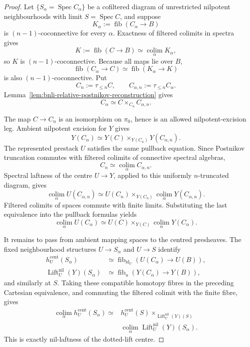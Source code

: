 \begin{proof}
Let $\{S_\alpha=\operatorname{Spec}C_\alpha\}$ be a cofiltered diagram of
unrestricted nilpotent neighbourhoods with limit
$S=\operatorname{Spec}C$, and suppose
\[
    K_\alpha:=\operatorname{fib}(C_\alpha\to B)
\]
is $(n-1)$-coconnective for every $\alpha$.  Exactness of filtered colimits
in spectra gives
\[
    K:=\operatorname{fib}(C\to B)
    \simeq
    \operatorname*{colim}_\alpha K_\alpha,
\]
so $K$ is $(n-1)$-coconnective.  Because all maps lie over $B$,
\[
    \operatorname{fib}(C_\alpha\to C)
    \simeq
    \operatorname{fib}(K_\alpha\to K)
\]
is also $(n-1)$-coconnective.  Put
\[
    C_n:=\tau_{\leq n}C,
    \qquad
    C_{\alpha,n}:=\tau_{\leq n}C_\alpha.
\]
Lemma~\ref{lem:bnli-relative-postnikov-reconstruction} gives
\[
\boxed{
    C_\alpha
    \simeq
    C\times_{C_n}C_{\alpha,n}.}
\]

The map $C\to C_n$ is an isomorphism on $\pi_0$, hence is an allowed
nilpotent-excision leg.  Ambient nilpotent excision for $Y$ gives
\[
\boxed{
    Y(C_\alpha)
    \simeq
    Y(C)\times_{Y(C_n)}Y(C_{\alpha,n}).}
\]
The represented prestack $U$ satisfies the same pullback equation.  Since
Postnikov truncation commutes with filtered colimits of connective spectral
algebras,
\[
    C_n\simeq\operatorname*{colim}_\alpha C_{\alpha,n}.
\]
Spectral laftness of the centre $U\to Y$, applied to this uniformly
$n$-truncated diagram, gives
\[
\boxed{
    \operatorname*{colim}_\alpha U(C_{\alpha,n})
    \simeq
    U(C_n)\times_{Y(C_n)}
    \operatorname*{colim}_\alpha Y(C_{\alpha,n}).}
\]
Filtered colimits of spaces commute with finite limits.  Substituting the last
equivalence into the pullback formulas yields
\[
\boxed{
    \operatorname*{colim}_\alpha U(C_\alpha)
    \simeq
    U(C)\times_{Y(C)}
    \operatorname*{colim}_\alpha Y(C_\alpha).}
\]

It remains to pass from ambient mapping spaces to the centred presheaves.  The
fixed neighbourhood structures $U\to S_\alpha$ and $U\to S$ identify
\[
\begin{aligned}
    h_U^{\mathrm{cent}}(S_\alpha)
    &\simeq
    \operatorname{fib}_{\operatorname{id}_U}
    \left(U(C_\alpha)\to U(B)\right),\\
    \operatorname{Lift}^{\mathrm{nil}}_U(Y)(S_\alpha)
    &\simeq
    \operatorname{fib}_{u}
    \left(Y(C_\alpha)\to Y(B)\right),
\end{aligned}
\]
and similarly at $S$.  Taking these compatible homotopy fibres in the
preceding Cartesian equivalence, and commuting the filtered colimit with the
finite fibre, gives
\[
\boxed{
\begin{aligned}
    \operatorname*{colim}_\alpha h_U^{\mathrm{cent}}(S_\alpha)
    \simeq{}&
    h_U^{\mathrm{cent}}(S)
    \times_{\operatorname{Lift}^{\mathrm{nil}}_U(Y)(S)}\\
    &\operatorname*{colim}_\alpha
    \operatorname{Lift}^{\mathrm{nil}}_U(Y)(S_\alpha).
\end{aligned}}
\]
This is exactly nil-laftness of the dotted-lift centre.
\end{proof}

